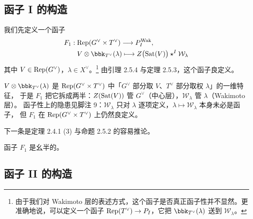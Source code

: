 \subsection{函子 I 的构造}\label{sec:F1}

我们先定义一个函子
\begin{align*}
F_1:\;&\Rep(G^\vee\times T^\vee)\longrightarrow \PWak,\\
&V\otimes\bbk_{T^\vee}(\lambda)\longmapsto Z\bigl(\Sat(V)\bigr)\conv^{I}\mathcal{W}_\lambda
\end{align*}
其中 $V\in\mathrm{Rep}(G^\vee)$，$\lambda\in X^\vee$。\footnote{由于我们对 Wakimoto 层的表述方式，这个函子是否真正函子性并不显然。更准确地说，可以定义一个函子 $\mathrm{Rep}(T^\vee)\to P_I$，它把 $\bbk_{T^\vee}(\lambda)$ 送到 $\mathcal{W}_\lambda$。}
由引理 2.5.4 与定理 2.5.3，这个函子良定义。

\begin{yizhu}
$V\otimes\bbk_{T^\vee}(\lambda)$ 是 $\mathrm{Rep}(G^\vee\times T^\vee)$ 中「$G^\vee$ 部分取 $V$、$T^\vee$ 部分取权 $\lambda$」的一维特征，
于是 $F_1$ 把它拆成两半：$Z(\mathrm{Sat}(V))$ 管 $G^\vee$（中心层），$\mathcal{W}_\lambda$ 管 $\lambda$（Wakimoto 层）。
函子性上的隐患见脚注 9：$\mathcal{W}_\lambda$ 只对 $\lambda$ 逐项定义，$\lambda\mapsto\mathcal{W}_\lambda$ 本身未必是函子，
但 $F_1$ 在 $\mathrm{Rep}(G^\vee\times T^\vee)$ 上仍然良定义。
\end{yizhu}

下一条是定理 2.4.1 (3) 与命题 2.5.2 的容易推论。

\begin{lemma}\label{lem:F1mon}
函子 $F_1$ 是幺半的。
\end{lemma}

\subsection{函子 II 的构造}\label{sec:F2}

